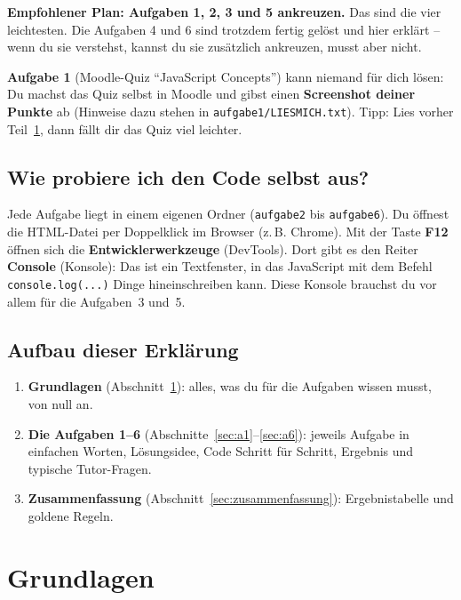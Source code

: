 \documentclass[a4paper,11pt]{article}
\begin{document}
\begin{merkbox}[title={Strategie}]
\textbf{Empfohlener Plan: Aufgaben 1, 2, 3 und 5 ankreuzen.} Das sind die vier leichtesten.
Die Aufgaben 4 und 6 sind trotzdem fertig gelöst und hier erklärt -- wenn du sie verstehst, kannst du sie
zusätzlich ankreuzen, musst aber nicht.

\textbf{Aufgabe 1} (Moodle-Quiz "`JavaScript Concepts"') kann niemand für dich lösen: Du machst das Quiz selbst in
Moodle und gibst einen \textbf{Screenshot deiner Punkte} ab (Hinweise dazu stehen in \texttt{aufgabe1/LIESMICH.txt}).
Tipp: Lies vorher Teil~\ref{sec:grundlagen}, dann fällt dir das Quiz viel leichter.
\end{merkbox}

\subsection*{Wie probiere ich den Code selbst aus?}

Jede Aufgabe liegt in einem eigenen Ordner (\texttt{aufgabe2} bis \texttt{aufgabe6}). Du öffnest die
HTML-Datei per Doppelklick im Browser (z.\,B. Chrome). Mit der Taste \textbf{F12} öffnen sich die
\textbf{Entwicklerwerkzeuge} (DevTools). Dort gibt es den Reiter \textbf{Console} (Konsole): Das ist ein
Textfenster, in das JavaScript mit dem Befehl \lstinline|console.log(...)| Dinge hineinschreiben kann.
Diese Konsole brauchst du vor allem für die Aufgaben~3 und~5.

\subsection*{Aufbau dieser Erklärung}
\begin{enumerate}[nosep]
  \item \textbf{Grundlagen} (Abschnitt~\ref{sec:grundlagen}): alles, was du für die Aufgaben wissen musst, von null an.
  \item \textbf{Die Aufgaben 1--6} (Abschnitte~\ref{sec:a1}--\ref{sec:a6}): jeweils Aufgabe in einfachen Worten,
        Lösungsidee, Code Schritt für Schritt, Ergebnis und typische Tutor-Fragen.
  \item \textbf{Zusammenfassung} (Abschnitt~\ref{sec:zusammenfassung}): Ergebnistabelle und goldene Regeln.
\end{enumerate}

\section{Grundlagen}\label{sec:grundlagen}
\end{document}
